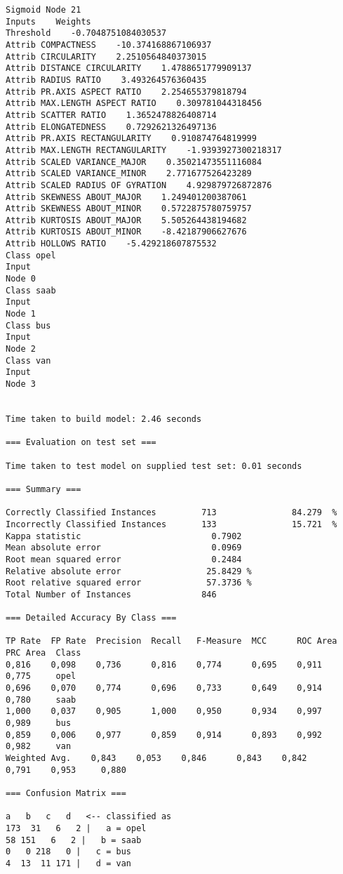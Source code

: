 \documentclass[
	article,			%
	11pt,				%
	oneside,			%
	a4paper,			%
	english,			%
	brazil,				%
	sumario=tradicional
	]{abntex2}
\begin{document}
\begin{lstlisting}
Sigmoid Node 21
Inputs    Weights
Threshold    -0.7048751084030537
Attrib COMPACTNESS    -10.374168867106937
Attrib CIRCULARITY    2.2510564840373015
Attrib DISTANCE CIRCULARITY    1.4788651779909137
Attrib RADIUS RATIO    3.493264576360435
Attrib PR.AXIS ASPECT RATIO    2.254655379818794
Attrib MAX.LENGTH ASPECT RATIO    0.309781044318456
Attrib SCATTER RATIO    1.3652478826408714
Attrib ELONGATEDNESS    0.7292621326497136
Attrib PR.AXIS RECTANGULARITY    0.910874764819999
Attrib MAX.LENGTH RECTANGULARITY    -1.9393927300218317
Attrib SCALED VARIANCE_MAJOR    0.35021473551116084
Attrib SCALED VARIANCE_MINOR    2.771677526423289
Attrib SCALED RADIUS OF GYRATION    4.929879726872876
Attrib SKEWNESS ABOUT_MAJOR    1.249401200387061
Attrib SKEWNESS ABOUT_MINOR    0.5722875780759757
Attrib KURTOSIS ABOUT_MAJOR    5.505264438194682
Attrib KURTOSIS ABOUT_MINOR    -8.42187906627676
Attrib HOLLOWS RATIO    -5.429218607875532
Class opel
Input
Node 0
Class saab
Input
Node 1
Class bus
Input
Node 2
Class van
Input
Node 3


Time taken to build model: 2.46 seconds

=== Evaluation on test set ===

Time taken to test model on supplied test set: 0.01 seconds

=== Summary ===

Correctly Classified Instances         713               84.279  %
Incorrectly Classified Instances       133               15.721  %
Kappa statistic                          0.7902
Mean absolute error                      0.0969
Root mean squared error                  0.2484
Relative absolute error                 25.8429 %
Root relative squared error             57.3736 %
Total Number of Instances              846     

=== Detailed Accuracy By Class ===

TP Rate  FP Rate  Precision  Recall   F-Measure  MCC      ROC Area  PRC Area  Class
0,816    0,098    0,736      0,816    0,774      0,695    0,911     0,775     opel
0,696    0,070    0,774      0,696    0,733      0,649    0,914     0,780     saab
1,000    0,037    0,905      1,000    0,950      0,934    0,997     0,989     bus
0,859    0,006    0,977      0,859    0,914      0,893    0,992     0,982     van
Weighted Avg.    0,843    0,053    0,846      0,843    0,842      0,791    0,953     0,880     

=== Confusion Matrix ===

a   b   c   d   <-- classified as
173  31   6   2 |   a = opel
58 151   6   2 |   b = saab
0   0 218   0 |   c = bus
4  13  11 171 |   d = van


\end{lstlisting}
\end{document}
